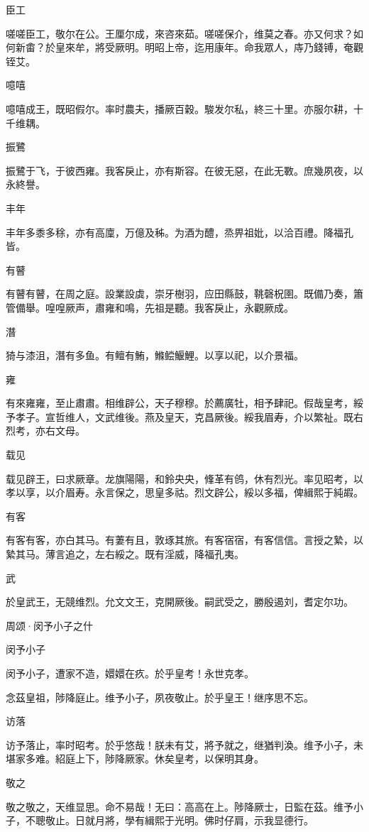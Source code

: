 臣工

嗟嗟臣工，敬尔在公。王厘尔成，來咨來茹。嗟嗟保介，维莫之春。亦又何求？如何新畬？於皇來牟，將受厥明。明昭上帝，迄用康年。命我眾人，庤乃錢镈，奄觀铚艾。

噫嘻

噫嘻成王，既昭假尔。率时農夫，播厥百穀。駿发尔私，終三十里。亦服尔耕，十千维耦。

振鷺

振鷺于飞，于彼西雍。我客戾止，亦有斯容。在彼无惡，在此无斁。庶幾夙夜，以永終譽。

丰年

丰年多黍多稌，亦有高廩，万億及秭。为酒为醴，烝畀祖妣，以洽百禮。降福孔皆。

有瞽

有瞽有瞽，在周之庭。設業設虡，崇牙樹羽，应田縣鼓，鞉磬柷圉。既備乃奏，簫管備舉。喤喤厥声，肅雍和鳴，先祖是聽。我客戾止，永觀厥成。

潛

猗与漆沮，潛有多鱼。有鳣有鮪，鰷鲿鰋鯉。以享以祀，以介景福。

雍

有來雍雍，至止肅肅。相维辟公，天子穆穆。於薦廣牡，相予肆祀。假哉皇考，綏予孝子。宣哲维人，文武维後。燕及皇天，克昌厥後。綏我眉寿，介以繁祉。既右烈考，亦右文母。

载见

载见辟王，曰求厥章。龙旗陽陽，和鈴央央，鞗革有鸧，休有烈光。率见昭考，以孝以享，以介眉寿。永言保之，思皇多祜。烈文辟公，綏以多福，俾緝熙于純嘏。

有客

有客有客，亦白其马。有萋有且，敦琢其旅。有客宿宿，有客信信。言授之縶，以縶其马。薄言追之，左右綏之。既有淫威，降福孔夷。

武

於皇武王，无競维烈。允文文王，克開厥後。嗣武受之，勝殷遏刘，耆定尔功。




周颂·闵予小子之什


闵予小子

闵予小子，遭家不造，嬛嬛在疚。於乎皇考！永世克孝。

念茲皇祖，陟降庭止。维予小子，夙夜敬止。於乎皇王！继序思不忘。

访落

访予落止，率时昭考。於乎悠哉！朕未有艾，將予就之，继猶判渙。维予小子，未堪家多难。紹庭上下，陟降厥家。休矣皇考，以保明其身。

敬之

敬之敬之，天维显思。命不易哉！无曰：高高在上。陟降厥士，日監在茲。维予小子，不聰敬止。日就月將，學有緝熙于光明。佛时仔肩，示我显德行。

